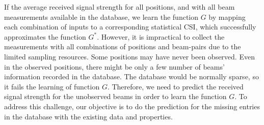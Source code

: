 \documentclass[12pt, draftcls, onecolumn]{IEEEtran}
\theoremstyle{plain}
\theoremstyle{definition}
\theoremstyle{remark}
\newcommand{\nt}[1]{\textcolor{red}{\textbf{[#1]}}}
\begin{document}
If the average received signal strength for all positions, and with all beam measurements available in the database, we learn the function $G$ by mapping each combination of inputs to a corresponding statistical CSI, which successfully approximates the function $G^*$.
However, it is impractical to collect the measurements with all combinations of positions and beam-pairs due to the limited sampling resources.
Some positions may have never been observed.
Even in the observed positions, there might be only a few number of beams' information recorded in the database.
The database would be normally sparse, so it fails the learning of function $G$.
Therefore, we need to predict the received signal strength for the unobserved beams in order to learn the function $G$.
To address this challenge, our objective is to do the prediction for the missing entries in the database with the existing data and properties.
\end{document}
